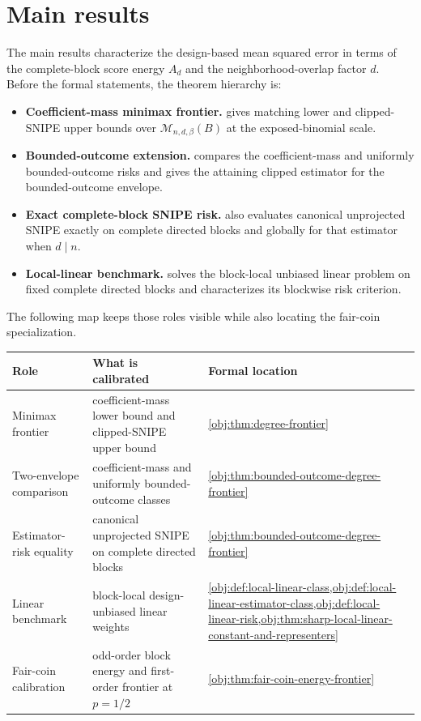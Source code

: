 \section{Main results}

The main results characterize the design-based mean squared error in terms of the complete-block score energy \(A_d\) and the neighborhood-overlap factor \(d\). Before the formal statements, the theorem hierarchy is:
\begin{itemize}
\item \textbf{Coefficient-mass minimax frontier.}  gives matching lower and clipped-SNIPE upper bounds over \(\mathcal M_{n,d,\beta}(B)\) at the exposed-binomial scale.
\item \textbf{Bounded-outcome extension.}  compares the coefficient-mass and uniformly bounded-outcome risks and gives the attaining clipped estimator for the bounded-outcome envelope.
\item \textbf{Exact complete-block SNIPE risk.}  also evaluates canonical unprojected SNIPE exactly on complete directed blocks and globally for that estimator when \(d\mid n\).
\item \textbf{Local-linear benchmark.}  solves the block-local unbiased linear problem on fixed complete directed blocks and characterizes its blockwise risk criterion.
\end{itemize}

The following map keeps those roles visible while also locating the fair-coin specialization.
\begin{center}
\begin{tabular}{p{}p{}p{}}
\textbf{Role} & \textbf{What is calibrated} & \textbf{Formal location}\\
\hline
Minimax frontier & coefficient-mass lower bound and clipped-SNIPE upper bound & \cref{obj:thm:degree-frontier}\\
Two-envelope comparison & coefficient-mass and uniformly bounded-outcome classes & \cref{obj:thm:bounded-outcome-degree-frontier}\\
Estimator-risk equality & canonical unprojected SNIPE on complete directed blocks & \cref{obj:thm:bounded-outcome-degree-frontier}\\
Linear benchmark & block-local design-unbiased linear weights & \cref{obj:def:local-linear-class,obj:def:local-linear-estimator-class,obj:def:local-linear-risk,obj:thm:sharp-local-linear-constant-and-representers}\\
Fair-coin calibration & odd-order block energy and first-order frontier at \(p=1/2\) & \cref{obj:thm:fair-coin-energy-frontier}
\end{tabular}
\end{center}

